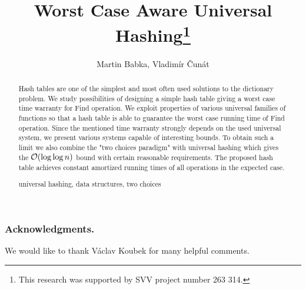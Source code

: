 \documentclass[runningheads,a4paper]{llncs}
\newcommand{\keywords}[1]{\par\addvspace\baselineskip
\noindent\keywordname\enspace\ignorespaces#1}
\begin{document}
\mainmatter

\author{Martin Babka, Vladimír Čunát}

\title{Worst Case Aware Universal Hashing\thanks{This research was supported by SVV project number 263 314.}}



\maketitle

\begin{abstract}
Hash tables are one of the simplest and most often used solutions to the dictionary problem. 
We study possibilities of designing a simple hash table giving a worst case time warranty for Find operation.
We exploit properties of various universal families of functions so that a hash table is able to guarantee the worst case running time of Find operation.
Since the mentioned time warranty strongly depends on the used universal system, we present various systems capable of interesting bounds.
To obtain such a limit we also combine the "two choices paradigm" with universal hashing which gives the $\mathcal{O}(\log \log n)$ bound with certain reasonable requirements.
The proposed hash table achieves constant amortized running times of all operations in the expected case.

\keywords{universal hashing, data structures, two choices}
\end{abstract}






\subsubsection*{Acknowledgments.}
We would like to thank Václav Koubek for many helpful comments.



\clearpage
% 


\end{document}
